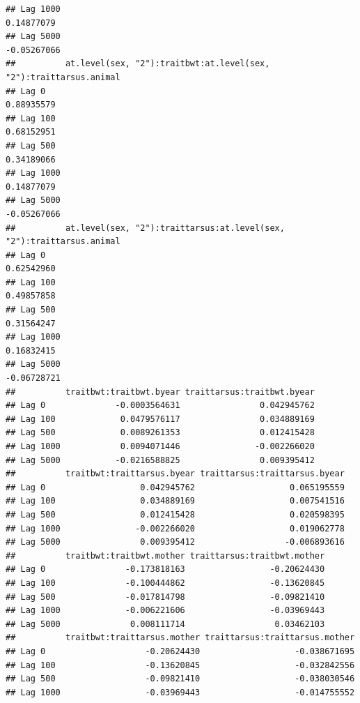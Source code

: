 \documentclass[
  12pt,
]{book}
\begin{document}
\begin{verbatim}
## Lag 1000                                                        0.14877079
## Lag 5000                                                       -0.05267066
##          at.level(sex, "2"):traitbwt:at.level(sex, "2"):traittarsus.animal
## Lag 0                                                           0.88935579
## Lag 100                                                         0.68152951
## Lag 500                                                         0.34189066
## Lag 1000                                                        0.14877079
## Lag 5000                                                       -0.05267066
##          at.level(sex, "2"):traittarsus:at.level(sex, "2"):traittarsus.animal
## Lag 0                                                              0.62542960
## Lag 100                                                            0.49857858
## Lag 500                                                            0.31564247
## Lag 1000                                                           0.16832415
## Lag 5000                                                          -0.06728721
##          traitbwt:traitbwt.byear traittarsus:traitbwt.byear
## Lag 0              -0.0003564631                0.042945762
## Lag 100             0.0479576117                0.034889169
## Lag 500             0.0089261353                0.012415428
## Lag 1000            0.0094071446               -0.002266020
## Lag 5000           -0.0216588825                0.009395412
##          traitbwt:traittarsus.byear traittarsus:traittarsus.byear
## Lag 0                   0.042945762                   0.065195559
## Lag 100                 0.034889169                   0.007541516
## Lag 500                 0.012415428                   0.020598395
## Lag 1000               -0.002266020                   0.019062778
## Lag 5000                0.009395412                  -0.006893616
##          traitbwt:traitbwt.mother traittarsus:traitbwt.mother
## Lag 0                -0.173818163                 -0.20624430
## Lag 100              -0.100444862                 -0.13620845
## Lag 500              -0.017814798                 -0.09821410
## Lag 1000             -0.006221606                 -0.03969443
## Lag 5000              0.008111714                  0.03462103
##          traitbwt:traittarsus.mother traittarsus:traittarsus.mother
## Lag 0                    -0.20624430                   -0.038671695
## Lag 100                  -0.13620845                   -0.032842556
## Lag 500                  -0.09821410                   -0.038030546
## Lag 1000                 -0.03969443                   -0.014755552

\end{verbatim}
\end{document}
